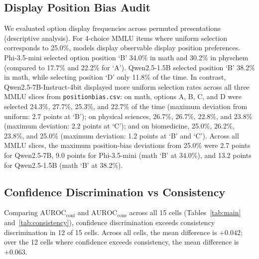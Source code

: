 \documentclass[sigconf,nonacm]{acmart}
\makeatletter
\DeclareRobustCommand{\_}{\ifmmode\nfss@text{\textunderscore}\else\textunderscore\allowbreak\fi}
\makeatother
\begin{document}
\subsection{Display Position Bias Audit}
\label{sec:pos_bias}
We evaluated option display frequencies across permuted presentations (descriptive analysis). For 4-choice MMLU items where uniform selection corresponds to 25.0\%, models display observable display position preferences. \textsf{Phi-3.5-mini} selected option position `B' 34.0\% in math and 30.2\% in physchem (compared to 17.7\% and 22.2\% for `A'). \textsf{Qwen2.5-1.5B} selected position `B' 38.2\% in math, while selecting position `D' only 11.8\% of the time. In contrast, \textsf{Qwen2.5-7B-Instruct-4bit} displayed more uniform selection rates across all three MMLU slices from \texttt{position\_bias.csv}: on math, options A, B, C, and D were selected 24.3\%, 27.7\%, 25.3\%, and 22.7\% of the time (maximum deviation from uniform: 2.7 points at `B'); on physical sciences, 26.7\%, 26.7\%, 22.8\%, and 23.8\% (maximum deviation: 2.2 points at `C'); and on biomedicine, 25.0\%, 26.2\%, 23.8\%, and 25.0\% (maximum deviation: 1.2 points at `B' and `C'). Across all MMLU slices, the maximum position-bias deviations from 25.0\% were 2.7 points for \textsf{Qwen2.5-7B}, 9.0 points for \textsf{Phi-3.5-mini} (math `B' at 34.0\%), and 13.2 points for \textsf{Qwen2.5-1.5B} (math `B' at 38.2\%).

\subsection{Confidence Discrimination vs Consistency}
Comparing $\text{AUROC}_{\text{conf}}$ and $\text{AUROC}_{\text{cons}}$ across all 15 cells (Tables~\ref{tab:main} and~\ref{tab:consistency}), confidence discrimination exceeds consistency discrimination in 12 of 15 cells. Across all cells, the mean difference is $+0.042$; over the 12 cells where confidence exceeds consistency, the mean difference is $+0.063$.
\end{document}
